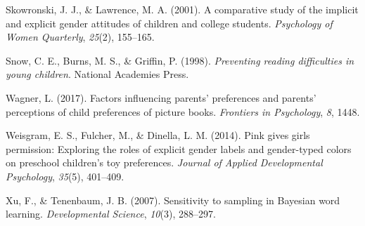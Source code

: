\documentclass[
  english,
  ,man,floatsintext]{apa6}
\begin{document}
\leavevmode\hypertarget{ref-skowronski2001comparative}{}%
Skowronski, J. J., \& Lawrence, M. A. (2001). A comparative study of the implicit and explicit gender attitudes of children and college students. \emph{Psychology of Women Quarterly}, \emph{25}(2), 155--165.

\leavevmode\hypertarget{ref-snow1998preventing}{}%
Snow, C. E., Burns, M. S., \& Griffin, P. (1998). \emph{Preventing reading difficulties in young children}. National Academies Press.

\leavevmode\hypertarget{ref-wagner2017factors}{}%
Wagner, L. (2017). Factors influencing parents' preferences and parents' perceptions of child preferences of picture books. \emph{Frontiers in Psychology}, \emph{8}, 1448.

\leavevmode\hypertarget{ref-weisgram2014pink}{}%
Weisgram, E. S., Fulcher, M., \& Dinella, L. M. (2014). Pink gives girls permission: Exploring the roles of explicit gender labels and gender-typed colors on preschool children's toy preferences. \emph{Journal of Applied Developmental Psychology}, \emph{35}(5), 401--409.

\leavevmode\hypertarget{ref-xu2007b}{}%
Xu, F., \& Tenenbaum, J. B. (2007). Sensitivity to sampling in Bayesian word learning. \emph{Developmental Science}, \emph{10}(3), 288--297.
\end{document}
